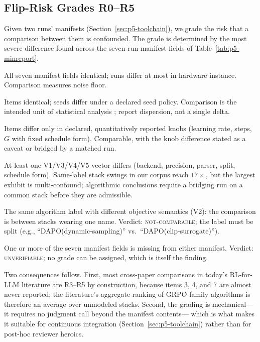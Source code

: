 \documentclass{article}  \usepackage[preprint,nonatbib]{neurips_2026} \usepackage[numbers]{natbib}
\providecommand{\tableref}[1]{Table~\ref{#1}}
\providecommand{\secref}[1]{Section~\ref{#1}}
\begin{document}
\subsection{Flip-Risk Grades R0--R5}
\label{sec:p5-grades}
Given two runs' manifests (\secref{sec:p5-toolchain}), we grade the risk that
a comparison between them is confounded. The grade is determined by the most
severe difference found across the seven run-manifest fields of
\tableref{tab:p5-minreport}.
\begin{description}[leftmargin=1.5em, itemsep=2pt, topsep=2pt]
\item[R0 --- Replicate.] All seven manifest fields identical; runs differ at most in
hardware instance. Comparison measures noise floor.
\item[R1 --- Seed-only.] Items identical; seeds differ under a declared seed
policy. Comparison is the intended unit of statistical analysis
\citep{colas2019hitchhiker, agarwal2021deep}; report dispersion, not a single
delta.
\item[R2 --- Declared-knob.] Items differ only in declared, quantitatively
reported knobs (learning rate, steps, $G$ with fixed schedule form).
Comparable, with the knob difference stated as a caveat or bridged by a
matched run.
\item[R3 --- Stack-vector.] At least one V1/V3/V4/V5 vector differs
(backend, precision, parser, split, schedule form). Same-label stack swings in
our corpus reach $17\times$, but the largest exhibit is multi-confound;
algorithmic conclusions require a bridging run
on a common stack before they are admissible.
\item[R4 --- Label collision.] The same algorithm label with different
objective semantics (V2): the comparison is between stacks wearing one name.
Verdict: \textsc{not-comparable}; the label must be split (e.g.,
``DAPO(dynamic-sampling)'' vs.\ ``DAPO(clip-surrogate)'').
\item[R5 --- Undeclared.] One or more of the seven manifest fields is missing from
either manifest. Verdict: \textsc{unverifiable}; no grade can be assigned,
which is itself the finding.
\end{description}
Two consequences follow. First, most cross-paper comparisons in today's
RL-for-LLM literature are R3--R5 by construction, because items 3, 4, and 7
are almost never reported; the literature's aggregate ranking of GRPO-family
algorithms is therefore an average over unmodeled stacks. Second, the grading
is mechanical---it requires no judgment call beyond the manifest contents---
which is what makes it suitable for continuous integration
(\secref{sec:p5-toolchain}) rather than for post-hoc reviewer heroics.
\end{document}
